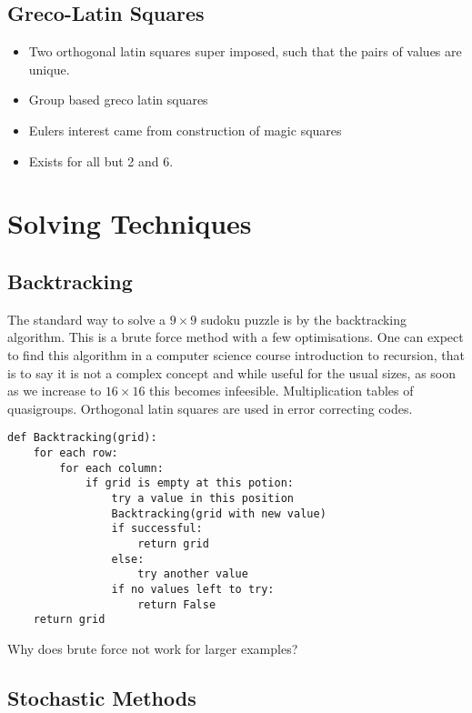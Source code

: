 \documentclass[a4paper,12pt]{article}
\begin{document}
	\subsection{Greco-Latin Squares}

		\begin{itemize}
		\item{Two orthogonal latin squares super imposed, such that the pairs of values are unique.}
		\item{Group based greco latin squares}
		\item{Eulers interest came from construction of magic squares}
		\item{Exists for all but 2 and 6.}
		\end{itemize}

\section{Solving Techniques}
	\subsection{Backtracking}
		
		The standard way to solve a $9 \times 9$ sudoku puzzle is by the backtracking algorithm. 
		This is a brute force method with a few optimisations.
		One can expect to find this algorithm in a computer science course introduction to recursion, that is to say it is not a complex concept 
		and while useful for the usual sizes, as soon as we increase to $16 \times 16$ this becomes infeesible.
		Multiplication tables of quasigroups.
		Orthogonal latin squares are used in error correcting codes.
		
		\begin{lstlisting}[caption=Backtracking]
def Backtracking(grid):
    for each row:
        for each column:
            if grid is empty at this potion:
                try a value in this position
                Backtracking(grid with new value)
                if successful:
                    return grid
                else:
                    try another value
                if no values left to try:
                    return False
    return grid						
		\end{lstlisting}
		
		Why does brute force not work for larger examples?

	\subsection{Stochastic Methods}
\end{document}
